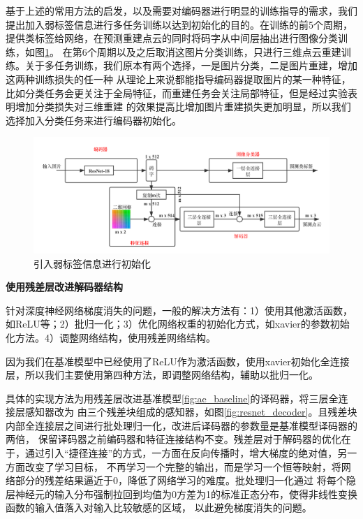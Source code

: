 \documentclass[bachelor, nocolorlinks, printoneside]{seuthesis} %
\begin{document}
\begin{Main}
基于上述的常用方法的启发，以及需要对编码器进行明显的训练指导的需求，我们提出加入弱标签信息进行多任务训练以达到初始化的目的。在训练的前5个周期，提供类标签给网络，在预测重建点云的同时将码字从中间层抽出进行图像分类训练，如图\ref{fig:class_init}。
在第6个周期以及之后取消这图片分类训练，只进行三维点云重建训练。关于多任务训练，我们原本有两个选择，一是图片分类，二是图片重建，增加这两种训练损失的任一种
从理论上来说都能指导编码器提取图片的某一种特征，比如分类任务会更关注于全局特征，而重建任务会关注局部特征，但是经过实验表明增加分类损失对三维重建
的效果提高比增加图片重建损失更加明显，所以我们选择加入分类任务来进行编码器初始化。

\begin{figure}
    \centering
    \includegraphics[width=0.99\columnwidth]{figs/model/ae_baseline_class.png}
    \caption{引入弱标签信息进行初始化}
    \label{fig:class_init}
\end{figure}
\FloatBarrier

\noindent
\textbf{使用残差层改进解码器结构}
\label{sec:resnet_decoder}

针对深度神经网络梯度消失的问题，一般的解决方法有：1）使用其他激活函数，如ReLU等；2）批归一化；3）优化网络权重的初始化方式，如xavier的参数初始化方法。4）调整网络结构，使用残差网络结构。

因为我们在基准模型中已经使用了ReLU作为激活函数，使用xavier初始化全连接层，所以我们主要使用第四种方法，即调整网络结构，辅助以批归一化。

具体的实现方法为用残差层改进基准模型\ref{fig:ae_baseline}的译码器，将三层全连接层感知器改为
由三个残差块组成的感知器，如图\ref{fig:resnet_decoder}。且残差块内部全连接层之间进行批处理归一化，改进后译码器的参数量是基准模型译码器的两倍，
保留译码器之前编码器和特征连接结构不变。残差层对于解码器的优化在于，通过引入“捷径连接”的方式，一方面在反向传播时，增大梯度的绝对值，另一方面改变了学习目标，
不再学习一个完整的输出，而是学习一个恒等映射，将网络部分的残差结果逼近于0，降低了网络学习的难度。批处理归一化通过
将每个隐层神经元的输入分布强制拉回到均值为0方差为1的标准正态分布，使得非线性变换函数的输入值落入对输入比较敏感的区域，
以此避免梯度消失的问题。



\end{Main}
\end{document}
